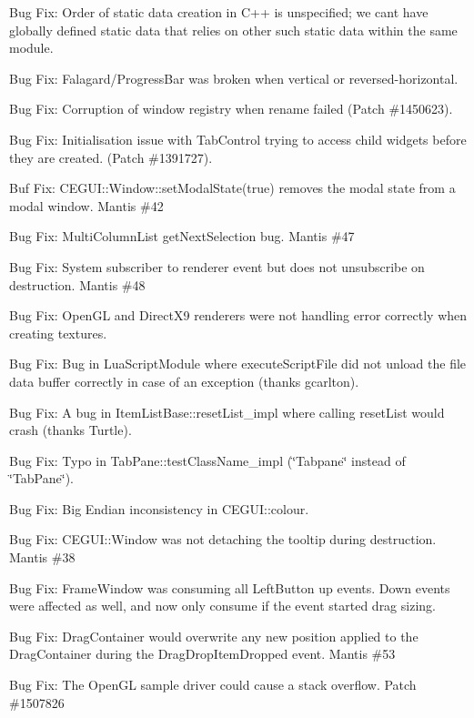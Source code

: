 \begin{DoxyItemize}
\item Bug Fix\+: Order of static data creation in C++ is unspecified; we can\textquotesingle{}t have globally defined static data that relies on other such static data within the same module.
\item Bug Fix\+: Falagard/\+Progress\+Bar was broken when vertical or reversed-\/horizontal.
\item Bug Fix\+: Corruption of window registry when rename failed (Patch \#1450623).
\item Bug Fix\+: Initialisation issue with Tab\+Control trying to access child widgets before they are created. (Patch \#1391727).
\item Buf Fix\+: C\+E\+G\+U\+I\+::\+Window\+::set\+Modal\+State(true) removes the modal state from a modal window. Mantis \#42
\item Bug Fix\+: Multi\+Column\+List get\+Next\+Selection bug. Mantis \#47
\item Bug Fix\+: System subscriber to renderer event but does not unsubscribe on destruction. Mantis \#48
\item Bug Fix\+: Open\+GL and Direct\+X9 renderers were not handling error correctly when creating textures.
\item Bug Fix\+: Bug in Lua\+Script\+Module where execute\+Script\+File did not unload the file data buffer correctly in case of an exception (thanks gcarlton).
\item Bug Fix\+: A bug in Item\+List\+Base\+::reset\+List\+\_\+impl where calling reset\+List would crash (thanks Turtle).
\item Bug Fix\+: Typo in Tab\+Pane\+::test\+Class\+Name\+\_\+impl (\char`\"{}\+Tabpane\char`\"{} instead of \char`\"{}\+Tab\+Pane\char`\"{}).
\item Bug Fix\+: Big Endian inconsistency in C\+E\+G\+U\+I\+::colour.
\item Bug Fix\+: C\+E\+G\+U\+I\+::\+Window was not detaching the tooltip during destruction. Mantis \#38
\item Bug Fix\+: Frame\+Window was consuming all Left\+Button up events. Down events were affected as well, and now only consume if the event started drag sizing.
\item Bug Fix\+: Drag\+Container would overwrite any new position applied to the Drag\+Container during the Drag\+Drop\+Item\+Dropped event. Mantis \#53
\item Bug Fix\+: The Open\+GL sample driver could cause a stack overflow. Patch \#1507826
\end{DoxyItemize}

